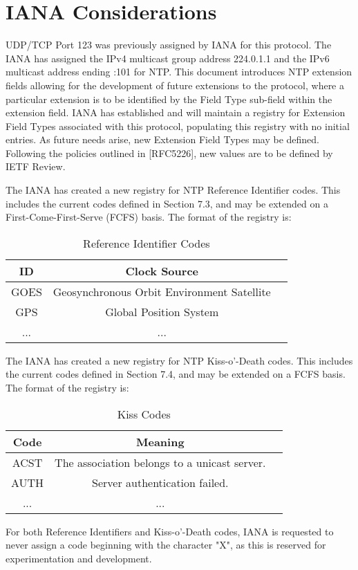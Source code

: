 \chapter{IANA Considerations}

UDP/TCP Port 123 was previously assigned by IANA for this protocol.
The IANA has assigned the IPv4 multicast group address 224.0.1.1 and
the IPv6 multicast address ending :101 for NTP.  This document
introduces NTP extension fields allowing for the development of
future extensions to the protocol, where a particular extension is to
be identified by the Field Type sub-field within the extension field.
IANA has established and will maintain a registry for Extension Field
Types associated with this protocol, populating this registry with no
initial entries.  As future needs arise, new Extension Field Types
may be defined.  Following the policies outlined in [RFC5226], new
values are to be defined by IETF Review.

The IANA has created a new registry for NTP Reference Identifier
codes.  This includes the current codes defined in Section 7.3, and
may be extended on a First-Come-First-Serve (FCFS) basis.  The format
of the registry is:

\begin{table}[htb]
\center
\begin{tabular}{c | c | c}
ID   & Clock Source \\
\hline
\hline
GOES & Geosynchronous Orbit Environment Satellite \\
GPS  & Global Position System                     \\
...  & ...                                        \\
\hline
\end{tabular}
\label{reference_identifier_codes}
\caption{Reference Identifier Codes}
\end{table}

The IANA has created a new registry for NTP Kiss-o'-Death codes.
This includes the current codes defined in Section 7.4, and may be
extended on a FCFS basis.  The format of the registry is:

\begin{table}[htb]
\center
\begin{tabular}{c | c | c}
Code & Meaning \\
\hline
\hline
ACST & The association belongs to a unicast server. \\
AUTH & Server authentication failed. \\
...  & ... \\
\hline
\end{tabular}
\label{kiss_codes}
\caption{Kiss Codes}
\end{table}

For both Reference Identifiers and Kiss-o'-Death codes, IANA is
requested to never assign a code beginning with the character "X", as
this is reserved for experimentation and development.
